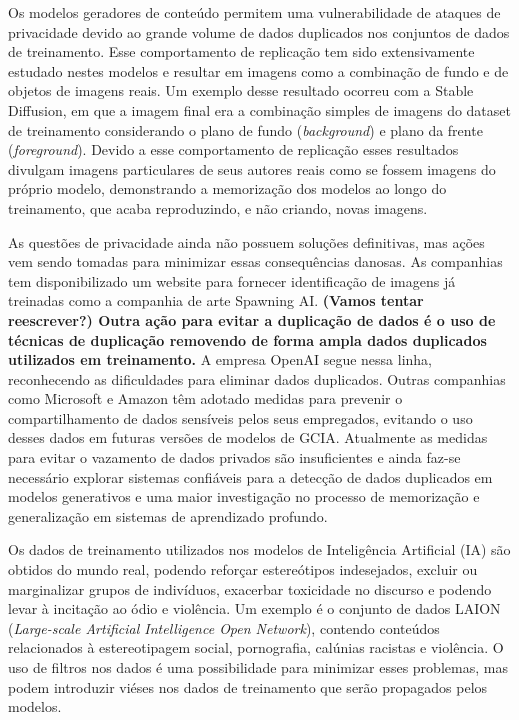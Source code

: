 Os modelos geradores de conteúdo permitem uma vulnerabilidade de ataques de privacidade devido ao grande 
volume de dados duplicados nos conjuntos de dados de treinamento. 
Esse comportamento de replicação tem sido extensivamente estudado nestes modelos e resultar em imagens 
como a combinação de fundo e de objetos de imagens reais. Um exemplo desse resultado 
ocorreu com a Stable Diffusion, em que a imagem  final era a combinação simples de imagens do dataset de treinamento 
considerando o plano de fundo (\textit{background}) e plano da frente (\textit{foreground}). Devido a esse comportamento de 
replicação esses resultados divulgam imagens particulares de seus autores reais como se fossem 
imagens do próprio modelo, demonstrando a memorização dos modelos ao longo
do treinamento, que acaba reproduzindo, e não criando, novas imagens.

As questões de privacidade ainda não possuem soluções definitivas, mas ações vem sendo tomadas para minimizar essas 
consequências danosas. As companhias tem disponibilizado um website para fornecer identificação de imagens 
já treinadas como a companhia de arte Spawning AI. 
\textbf{(Vamos tentar reescrever?) Outra ação para evitar a duplicação de dados é o uso de técnicas de duplicação
removendo de forma ampla dados duplicados utilizados em treinamento.} 
A empresa OpenAI segue nessa linha, reconhecendo as dificuldades para eliminar dados duplicados. 
Outras companhias como Microsoft e Amazon têm adotado medidas para prevenir o compartilhamento de 
dados sensíveis pelos seus empregados, evitando o uso desses dados em futuras versões de modelos de GCIA.
Atualmente as medidas para evitar o vazamento de dados privados são insuficientes e 
ainda faz-se necessário explorar sistemas confiáveis para a detecção de dados duplicados em modelos generativos e uma 
maior investigação no processo de memorização e generalização em sistemas de aprendizado profundo.

Os dados de treinamento utilizados nos modelos de Inteligência Artificial (IA) são obtidos do mundo real, podendo reforçar estereótipos indesejados, excluir ou marginalizar grupos de indivíduos, exacerbar toxicidade no discurso e podendo levar à incitação ao ódio e violência.
Um exemplo é o conjunto de dados LAION (\textit{Large-scale Artificial Intelligence Open Network}), contendo conteúdos relacionados à estereotipagem social,
pornografia, calúnias racistas e violência. O uso de filtros nos dados é uma possibilidade para minimizar esses problemas, mas podem introduzir viéses nos dados de treinamento que serão propagados pelos modelos.

